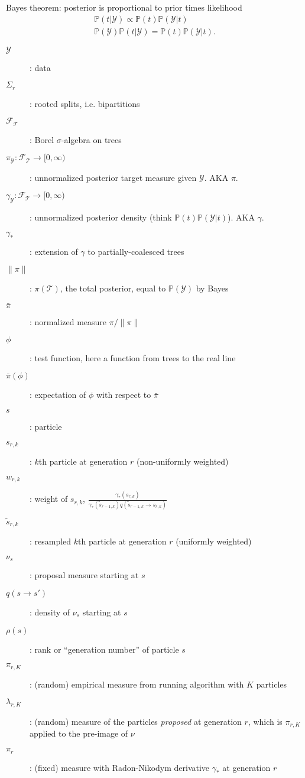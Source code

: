 \documentclass{report}
\newcommand{\data}{\mathcal Y}
\newcommand{\trees}{\mathcal T}
\newcommand{\PP}{\mathbb P}
\begin{document}
Bayes theorem: posterior is proportional to prior times likelihood
\begin{gather*}
\PP(t | \data) \propto \PP(t) \PP(\data | t) \\
\PP(\data) \PP(t | \data) = \PP(t) \PP(\data | t).
\end{gather*}

\begin{description}
\item[$\data$]: data
\item[$\Sigma_r$]: rooted splits, i.e. bipartitions
\item[$\mathcal F_\trees$]: Borel $\sigma$-algebra on trees
\item[$\pi_\data: \mathcal F_\trees \rightarrow [0, \infty)$]: unnormalized posterior target measure given $\data$. AKA $\pi$.
\item[$\gamma_\data: \mathcal F_\trees \rightarrow [0, \infty)$]: unnormalized posterior density (think $\PP(t) \PP(\data | t)$). AKA $\gamma$.
\item[$\gamma_*$]: extension of $\gamma$ to partially-coalesced trees
\item[$\|\pi\|$]: $\pi(\trees)$, the total posterior, equal to $\PP(\data)$ by Bayes
\item[$\bar \pi$]: normalized measure $\pi / \|\pi\|$
\item[$\phi$]: test function, here a function from trees to the real line
\item[$\bar \pi(\phi)$]: expectation of $\phi$ with respect to $\bar \pi$
\item[$s$]: particle
\item[$s_{r,k}$]: $k$th particle at generation $r$ (non-uniformly weighted)
\item[$w_{r,k}$]: weight of $s_{r,k}$, $\frac{\gamma_*(s_{r,k})}{\gamma_*(\tilde s_{r-1,k}) q(\tilde s_{r-1,k} \rightarrow s_{r,k})}$
\item[$\tilde s_{r,k}$]: resampled $k$th particle at generation $r$ (uniformly weighted)
\item[$\nu_s$]: proposal measure starting at $s$
\item[$q(s \rightarrow s')$]: density of $\nu_s$ starting at $s$
\item[$\rho(s)$]: rank or ``generation number'' of particle $s$
\item[$\pi_{r,K}$]: (random) empirical measure from running algorithm with $K$ particles
\item[$\lambda_{r,K}$]: (random) measure of the particles \emph{proposed} at generation $r$, which is $\pi_{r,K}$ applied to the pre-image of $\nu$
\item[$\pi_r$]: (fixed) measure with Radon-Nikodym derivative $\gamma_*$ at generation $r$

\end{description}
\end{document}
